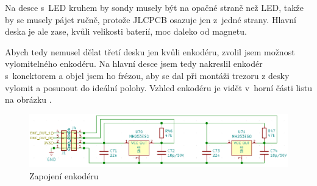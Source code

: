 Na desce s~LED kruhem by sondy musely být na opačné straně než LED, takže by se musely pájet ručně, protože JLCPCB osazuje jen z~je\-dné strany. Hlavní deska je ale zase, 
kvůli velikosti baterií, moc daleko od magnetu. 

Abych tedy nemusel dělat třetí desku jen kvůli enkodéru, zvolil jsem možnost vylomitelného enkodéru. Na hlavní desce jsem tedy nakreslil 
enkodér s~konektorem a objel jsem ho frézou, aby se dal při montáži trezoru z desky vylomit a posunout do ideální polohy.
Vzhled enkodéru je vidět v~horní části listu na obrázku .

\begin{figure}[htbp]
    \centering
    \includegraphics[width=\textwidth]{kapitoly/obrazky/E4/ir_motor_enkoder/enc.png}
    \caption{Zapojení enkodéru}
    \label{fig:E4-enkoder}
\end{figure}
